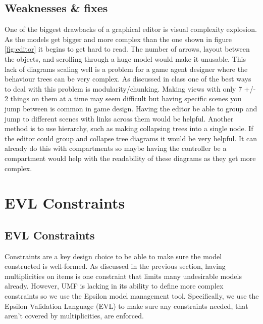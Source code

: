 \documentclass[letterpaper,12pt]{article}  %
\begin{document}
\subsection{Weaknesses & fixes}
One of the biggest drawbacks of a graphical editor is visual complexity explosion. As the models get bigger and more complex than the one shown in figure \ref{fig:editor} it begins to get hard to read. The number of arrows, layout between the objects, and scrolling through a huge model would make it unusable. This lack of diagrams scaling well is a problem for a game agent designer where the behaviour trees can be very complex. As discussed in class one of the best ways to deal with this problem is modularity/chunking. Making views with only 7 +/- 2 things on them at a time may seem difficult but having specific scenes you jump between is common in game design. Having the editor be able to group and jump to different scenes with links across them would be helpful. Another method is to use hierarchy, such as making collapsing trees into a single node. If the editor could group and collapse tree diagrams it would be very helpful. It can already do this with compartments so maybe having the controller be a compartment would help with the readability of these diagrams as they get more complex.


\section{EVL Constraints}
\subsection{EVL Constraints}

Constraints are a key design choice to be able to make sure the model constructed is well-formed. As discussed in the previous section, having multiplicities on items is one constraint that limits many undesirable models already. However, UMF is lacking in its ability to define more complex constraints so we use the Epsilon model management tool. Specifically, we use the Epsilon Validation Language (EVL) to make sure any constraints needed, that aren’t covered by multiplicities, are enforced.
\end{document}
